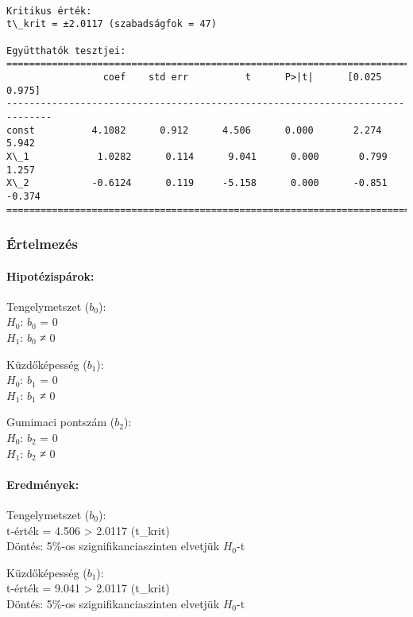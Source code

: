 \documentclass[11pt]{article}
\begin{document}
    \begin{Verbatim}[commandchars=\\\{\}]

Kritikus érték:
t\_krit = ±2.0117 (szabadságfok = 47)

Együtthatók tesztjei:
==============================================================================
                 coef    std err          t      P>|t|      [0.025      0.975]
------------------------------------------------------------------------------
const          4.1082      0.912      4.506      0.000       2.274       5.942
X\_1            1.0282      0.114      9.041      0.000       0.799       1.257
X\_2           -0.6124      0.119     -5.158      0.000      -0.851      -0.374
==============================================================================
    \end{Verbatim}

    \subsubsection{Értelmezés}\label{uxe9rtelmezuxe9s}

\paragraph{Hipotézispárok:}\label{hipotuxe9zispuxe1rok}

Tengelymetszet ($b_0$):\\
$H_0$: $b_0$ = 0\\
$H_1$: $b_0$ ≠ 0

Küzdőképesség ($b_1$):\\
$H_0$: $b_1$ = 0\\
$H_1$: $b_1$ ≠ 0

Gumimaci pontszám ($b_2$):\\
$H_0$: $b_2$ = 0\\
$H_1$: $b_2$ ≠ 0

\paragraph{Eredmények:}\label{eredmuxe9nyek}

Tengelymetszet ($b_0$):\\
\textbar t-érték\textbar{} = 4.506 \textgreater{} 2.0117 (t\_krit)\\
Döntés: 5\%-os szignifikanciaszinten elvetjük $H_0$-t

Küzdőképesség ($b_1$):\\
\textbar t-érték\textbar{} = 9.041 \textgreater{} 2.0117 (t\_krit)\\
Döntés: 5\%-os szignifikanciaszinten elvetjük $H_0$-t
\end{document}
